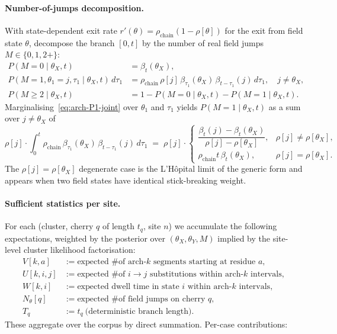 \paragraph{Number-of-jumps decomposition.}
With state-dependent exit rate $r'(\theta) = \rho_{\text{chain}}(1-\rho[\theta])$
for the exit from field state $\theta$, decompose the branch $[0, t]$
by the number of real field jumps $M \in \{0, 1, 2+\}$:
\begin{align}
  P(M = 0 \mid \theta_X, t) &= \beta_t(\theta_X),
  \label{eq:arch-P0}
  \\
  P(M = 1, \theta_1 = j, \tau_1 \mid \theta_X, t)\,d\tau_1
    &= \rho_{\text{chain}}\,\rho[j]\,
       \beta_{\tau_1}(\theta_X)\,\beta_{t-\tau_1}(j)\,d\tau_1,
    \quad j \ne \theta_X,
  \label{eq:arch-P1-joint}
  \\
  P(M \geq 2 \mid \theta_X, t)
    &= 1 - P(M=0\mid \theta_X, t) - P(M=1\mid \theta_X, t).
  \label{eq:arch-P2plus}
\end{align}
Marginalising~\eqref{eq:arch-P1-joint} over $\theta_1$ and $\tau_1$
yields $P(M=1 \mid \theta_X, t)$ as a sum over $j \ne \theta_X$ of
\begin{equation}
  \rho[j] \cdot \int_0^t \rho_{\text{chain}}\,\beta_{\tau_1}(\theta_X)\,\beta_{t-\tau_1}(j)\,d\tau_1
  \;=\;
  \rho[j] \cdot
  \begin{cases}
    \dfrac{\beta_t(j) - \beta_t(\theta_X)}{\rho[j] - \rho[\theta_X]},
      & \rho[j] \ne \rho[\theta_X], \\[6pt]
    \rho_{\text{chain}} t\,\beta_t(\theta_X),
      & \rho[j] = \rho[\theta_X].
  \end{cases}
  \label{eq:arch-P1-marg}
\end{equation}
The $\rho[j] = \rho[\theta_X]$ degenerate case is the L'H\^{o}pital
limit of the generic form and appears when two field states have
identical stick-breaking weight.

\paragraph{Sufficient statistics per site.}
\label{par:arch-hr}
For each (cluster, cherry $q$ of length $t_q$, site $n$) we accumulate
the following expectations, weighted by the posterior over
$(\theta_X, \theta_Y, M)$ implied by the site-level cluster likelihood
factorisation:
\begin{align}
  V[k, a]     &:= \text{expected \# of arch-}k\text{ segments starting at residue }a,
  \label{eq:arch-V} \\
  U[k, i, j]  &:= \text{expected \# of }i\to j\text{ substitutions within arch-}k
                  \text{ intervals},
  \label{eq:arch-U} \\
  W[k, i]     &:= \text{expected dwell time in state }i\text{ within arch-}k
                  \text{ intervals},
  \label{eq:arch-W} \\
  N_\theta[q] &:= \text{expected \# of field jumps on cherry }q,
  \label{eq:arch-Ntheta} \\
  T_q         &:= t_q\ \text{(deterministic branch length).}
  \label{eq:arch-Tq}
\end{align}
These aggregate over the corpus by direct summation. Per-case
contributions:

